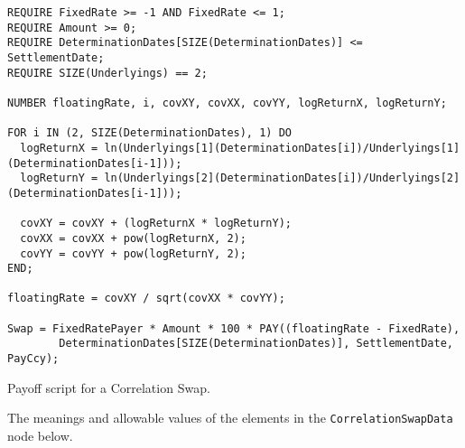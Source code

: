 \begin{listing}[hbt] 
\begin{verbatim} 
REQUIRE FixedRate >= -1 AND FixedRate <= 1;
REQUIRE Amount >= 0;
REQUIRE DeterminationDates[SIZE(DeterminationDates)] <= SettlementDate;
REQUIRE SIZE(Underlyings) == 2;

NUMBER floatingRate, i, covXY, covXX, covYY, logReturnX, logReturnY;

FOR i IN (2, SIZE(DeterminationDates), 1) DO
  logReturnX = ln(Underlyings[1](DeterminationDates[i])/Underlyings[1](DeterminationDates[i-1]));
  logReturnY = ln(Underlyings[2](DeterminationDates[i])/Underlyings[2](DeterminationDates[i-1]));

  covXY = covXY + (logReturnX * logReturnY);
  covXX = covXX + pow(logReturnX, 2);
  covYY = covYY + pow(logReturnY, 2);
END;

floatingRate = covXY / sqrt(covXX * covYY);

Swap = FixedRatePayer * Amount * 100 * PAY((floatingRate - FixedRate),
        DeterminationDates[SIZE(DeterminationDates)], SettlementDate, PayCcy);
\end{verbatim} 
\caption{Payoff script for a Correlation Swap.} 
\label{lst:correlation_swap} 
\end{listing} 
 
The meanings and allowable values of the elements in the \lstinline!CorrelationSwapData! node below. 
 

